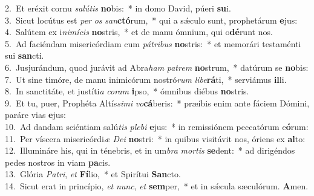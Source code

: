 {2.~}Et eréxit cornu \textit{sa}\textit{lú}\textit{tis} \textbf{no}bis:~* in domo David, púeri \textbf{su}i.\\
{3.~}Sicut locútus est \textit{per} \textit{os} \textit{san}\textbf{ctó}rum,~* qui a sǽculo sunt, prophetárum \textbf{e}jus:\\
{4.~}Salútem ex i\textit{ni}\textit{mí}\textit{cis} \textbf{no}stris,~* et de manu ómnium, qui o\textbf{dé}runt nos.\\
{5.~}Ad faciéndam misericórdiam cum \textit{pá}\textit{tri}\textit{bus} \textbf{no}stris:~* et memorári testaménti sui \textbf{san}cti.\\
{6.~}Jusjurándum, quod jurávit ad Abra\textit{ham} \textit{pa}\textit{trem} \textbf{no}strum,~* datúrum se \textbf{no}bis:\\
{7.~}Ut sine timóre, de manu inimicórum nostró\textit{rum} \textit{li}\textit{be}\textbf{rá}ti,~* serviámus \textbf{il}li.\\
{8.~}In sanctitáte, et justíti\textit{a} \textit{co}\textit{ram} \textbf{i}pso,~* ómnibus diébus \textbf{no}stris.\\
{9.~}Et tu, puer, Prophéta Altís\textit{si}\textit{mi} \textit{vo}\textbf{cá}beris:~* præíbis enim ante fáciem Dómini, paráre vias \textbf{e}jus:\\
{10.~}Ad dandam sciéntiam salú\textit{tis} \textit{ple}\textit{bi} \textbf{e}jus:~* in remissiónem peccatórum e\textbf{ó}rum:\\
{11.~}Per víscera misericórdi\textit{æ} \textit{De}\textit{i} \textbf{no}stri:~* in quibus visitávit nos, óriens ex \textbf{al}to:\\
{12.~}Illumináre his, qui in ténebris, et in um\textit{bra} \textit{mor}\textit{tis} \textbf{se}dent:~* ad dirigéndos pedes nostros in viam \textbf{pa}cis.\\
{13.~}Glória \textit{Pa}\textit{tri}, \textit{et} \textbf{Fí}lio,~* et Spirítui \textbf{San}cto.\\
{14.~}Sicut erat in princípio, \textit{et} \textit{nunc}, \textit{et} \textbf{sem}per,~* et in sǽcula sæculórum. \textbf{A}men.\\
